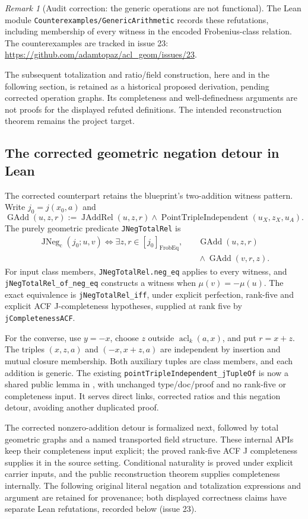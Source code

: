 \documentclass[11pt,oneside]{article}
\theoremstyle{definition}
\theoremstyle{remark}
\newtheorem{remark}[theorem]{Remark}
\newcommand{\acl}{\operatorname{acl}}
\newcommand{\lean}[1]{\nolinkurl{#1}}
\begin{document}
\begin{remark}[Audit correction: the generic operations are not functional]
The Lean module \lean{Counterexamples/GenericArithmetic} records these refutations,
including membership of every witness in the encoded Frobenius-class relation.
The counterexamples are tracked in issue 23:
\url{https://github.com/adamtopaz/acl_geom/issues/23}.

The subsequent
totalization and ratio/field construction, here and in the following section, is
retained as a historical proposed derivation, pending corrected operation graphs.
Its completeness and well-definedness arguments are not proofs for the displayed
refuted definitions. The intended reconstruction theorem remains the project target.
\end{remark}

\subsection{The corrected geometric negation detour in Lean}

The corrected counterpart retains the blueprint's two-addition witness pattern.
Write $j_0=j(x_0,a)$ and
\[
 \operatorname{GAdd}(u,z,r):=\operatorname{JAddRel}(u,z,r)
   \land\operatorname{PointTripleIndependent}(u_X,z_X,u_A).
\]
The purely geometric predicate \lean{JNegTotalRel} is
\[
\begin{split}
 \operatorname{JNeg}_{\mathrm c}(j_0;u,v)
 \Longleftrightarrow \exists z,r\in[j_0]_{\operatorname{FrobEq}},\quad&
 \operatorname{GAdd}(u,z,r)\\
 &{}\land\operatorname{GAdd}(v,r,z).
\end{split}
\]
For input class members, \lean{JNegTotalRel.neg_eq} applies to every witness,
and \lean{jNegTotalRel_of_neg_eq} constructs a witness when $\mu(v)=-\mu(u)$.
The exact equivalence is \lean{jNegTotalRel_iff}, under explicit perfection,
rank-five and explicit ACF J-completeness hypotheses, supplied at rank five by
\lean{jCompletenessACF}.

For the converse, use $y=-x$, choose $z$ outside $\acl_k(a,x)$, and put $r=x+z$.
The triples $(x,z,a)$ and $(-x,x+z,a)$ are independent by insertion and mutual
closure membership. Both auxiliary tuples are class members, and each addition
is generic. The existing \lean{pointTripleIndependent_jTupleOf} is now a shared
public lemma in , with unchanged
type/doc/proof and no rank-five or completeness input. It serves direct links,
corrected ratios and this negation detour, avoiding another duplicated proof.

The corrected nonzero-addition detour is formalized next, followed by total geometric
graphs and a named transported field structure. These internal APIs keep their completeness
input explicit; the proved rank-five ACF J completeness supplies it in the source setting.
Conditional naturality is proved under explicit carrier inputs, and the public reconstruction
theorem supplies completeness internally. The following original
literal negation and totalization expressions and argument are retained for provenance;
both displayed correctness claims have separate Lean refutations, recorded below (issue 23).
\end{document}
